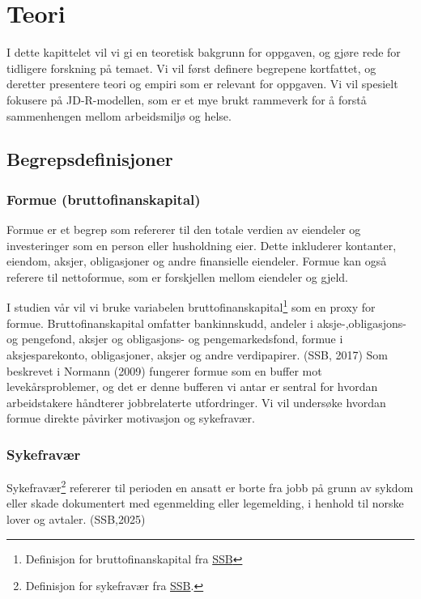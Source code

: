 \documentclass[
  12pt,
  a4paper,
  DIV=11,
  numbers=noendperiod]{scrartcl}
\begin{document}
\section{Teori}\label{sec:teori}

I dette kapittelet vil vi gi en teoretisk bakgrunn for oppgaven, og
gjøre rede for tidligere forskning på temaet. Vi vil først definere
begrepene kortfattet, og deretter presentere teori og empiri som er
relevant for oppgaven. Vi vil spesielt fokusere på JD-R-modellen, som er
et mye brukt rammeverk for å forstå sammenhengen mellom arbeidsmiljø og
helse.

\subsection{Begrepsdefinisjoner}\label{begrepsdefinisjoner}

\subsubsection{Formue
(bruttofinanskapital)}\label{formue-bruttofinanskapital}

Formue er et begrep som refererer til den totale verdien av eiendeler og
investeringer som en person eller husholdning eier. Dette inkluderer
kontanter, eiendom, aksjer, obligasjoner og andre finansielle eiendeler.
Formue kan også referere til nettoformue, som er forskjellen mellom
eiendeler og gjeld.

I studien vår vil vi bruke variabelen bruttofinanskapital\footnote{Definisjon
  for bruttofinanskapital fra
  \href{https://www.ssb.no/a/metadata/conceptvariable/vardok/3449/nb}{SSB}}
som en proxy for formue. Bruttofinanskapital omfatter bankinnskudd,
andeler i aksje-,obligasjons- og pengefond, aksjer og obligasjons- og
pengemarkedsfond, formue i aksjesparekonto, obligasjoner, aksjer og
andre verdipapirer. (SSB, 2017) Som beskrevet i Normann (2009) fungerer
formue som en buffer mot levekårsproblemer, og det er denne bufferen vi
antar er sentral for hvordan arbeidstakere håndterer jobbrelaterte
utfordringer. Vi vil undersøke hvordan formue direkte påvirker
motivasjon og sykefravær.

\subsubsection{Sykefravær}\label{sykefravuxe6r}

Sykefravær\footnote{Definisjon for sykefravær fra
  \href{https://www.ssb.no/arbeid-og-lonn/arbeidsmiljo-sykefravaer-og-arbeidskonflikter/statistikk/sykefravaer}{SSB}.}
refererer til perioden en ansatt er borte fra jobb på grunn av sykdom
eller skade dokumentert med egenmelding eller legemelding, i henhold til
norske lover og avtaler. (SSB,2025)
\end{document}
